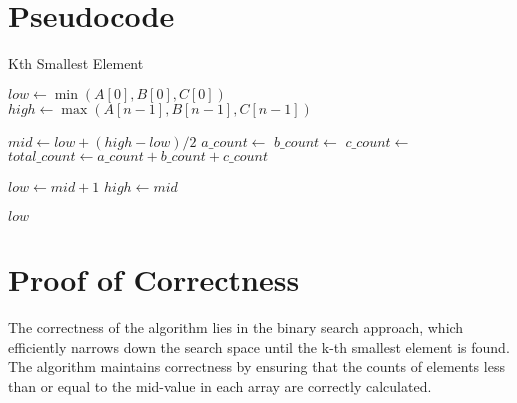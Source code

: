 \documentclass{article}
\begin{document}
\section{Pseudocode}
\begin{algorithm}
\caption{Kth Smallest Element}
\begin{algorithmic}[1]
        \State $low \gets \min(A[0],B[0],C[0])$
        \State $high \gets \max(A[n-1], B[n-1], C[n-1])$
        
            \State $mid \gets low + (high - low) / 2$
            \State $a\_count \gets$ 
            \State $b\_count \gets$ 
            \State $c\_count \gets$ 
            \State $total\_count \gets a\_count + b\_count + c\_count$
            
                \State $low \gets mid + 1$
            \Else
                \State $high \gets mid$
            \EndIf
        \EndWhile
        
        \State \Return $low$
    \EndFunction
\end{algorithmic}
\end{algorithm}

\section{Proof of Correctness}
The correctness of the algorithm lies in the binary search approach, which efficiently narrows down the search space until the k-th smallest element is found. The algorithm maintains correctness by ensuring that the counts of elements less than or equal to the mid-value in each array are correctly calculated.
\end{document}
